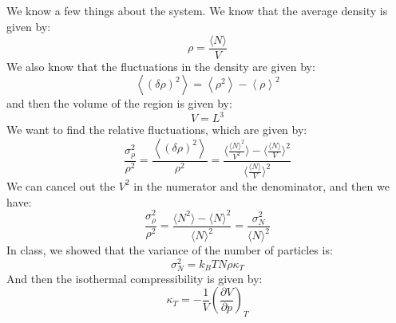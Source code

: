 \documentclass[12pt]{article}
\begin{document}
\subsection{}
We know a few things about the system. We know that the average density is given by:
\begin{equation}
  \rho = \frac{\langle N\rangle}{V}
\end{equation}
We also know that the fluctuations in the density are given by:
\begin{equation}
  \left\langle(\delta \rho)^{2}\right\rangle = \left\langle \rho^2\right\rangle - \left\langle \rho\right\rangle^2
\end{equation}
and then the volume of the region is given by:
\begin{equation}
  V = L^3
\end{equation}
We want to find the relative fluctuations, which are given by:
\begin{equation}
  \frac{\sigma _{\rho}^2}{\rho^2} = \frac{\left\langle(\delta \rho)^{2}\right\rangle}{\rho^2}=\frac{\langle \frac{\langle N\rangle^2}{V^2}\rangle - \langle \frac{\langle N\rangle}{V}\rangle^2}{\langle \frac{\langle N\rangle}{V}\rangle^2}
\end{equation}
We can cancel out the $V^2$ in the numerator and the denominator, and then we have:
\begin{equation}
  \frac{\sigma _{\rho}^2}{\rho^2} = \frac{\langle N^2\rangle - \langle N\rangle^2}{\langle N\rangle^2} = \frac{\sigma _{N}^2}{\langle N\rangle^2}
\end{equation}
In class, we showed that the variance of the number of particles is:
\begin{equation}
  \sigma _{N}^2 = k_B TN\rho \kappa _T
\end{equation}
And then the isothermal compressibility is given by:
\begin{equation}
  \kappa _T = -\frac{1}{V}\left(\frac{\partial V}{\partial p}\right)_T
\end{equation}
\end{document}

